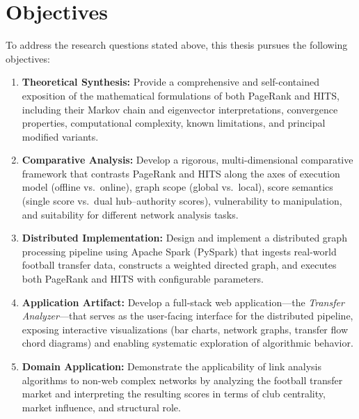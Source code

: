 \section{Objectives}
\label{sec:objectives}

To address the research questions stated above, this thesis pursues the following objectives:

\begin{enumerate}
    \item \textbf{Theoretical Synthesis:} Provide a comprehensive and self-contained exposition of the mathematical formulations of both PageRank and HITS, including their Markov chain and eigenvector interpretations, convergence properties, computational complexity, known limitations, and principal modified variants.

    \item \textbf{Comparative Analysis:} Develop a rigorous, multi-dimensional comparative framework that contrasts PageRank and HITS along the axes of execution model (offline vs.\ online), graph scope (global vs.\ local), score semantics (single score vs.\ dual hub--authority scores), vulnerability to manipulation, and suitability for different network analysis tasks.

    \item \textbf{Distributed Implementation:} Design and implement a distributed graph processing pipeline using Apache Spark (PySpark) that ingests real-world football transfer data, constructs a weighted directed graph, and executes both PageRank and HITS with configurable parameters.

    \item \textbf{Application Artifact:} Develop a full-stack web application---the \textit{Transfer Analyzer}---that serves as the user-facing interface for the distributed pipeline, exposing interactive visualizations (bar charts, network graphs, transfer flow chord diagrams) and enabling systematic exploration of algorithmic behavior.

    \item \textbf{Domain Application:} Demonstrate the applicability of link analysis algorithms to non-web complex networks by analyzing the football transfer market and interpreting the resulting scores in terms of club centrality, market influence, and structural role.
\end{enumerate}


